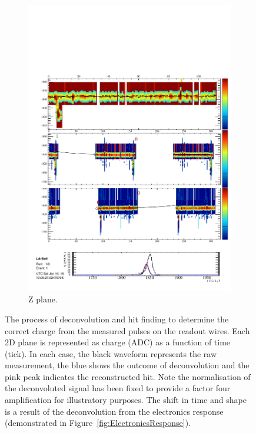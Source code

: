 \begin{figure}
\begin{subfigure}[t]{0.3\linewidth}
    \includegraphics[width=\textwidth]{HitFindingZ.pdf}
    \caption{Z plane.}
    \label{fig:HitFindingZ}
  \end{subfigure}
  \caption[The process of deconvolution and hit finding to determine the correct charge from the measured pulses on the readout wires.]{The process of deconvolution and hit finding to determine the correct charge from the measured pulses on the readout wires.  Each 2D plane is represented as charge (ADC) as a function of time (tick).  In each case, the black waveform represents the raw measurement, the blue shows the outcome of deconvolution and the pink peak indicates the reconstructed hit.  Note the normalisation of the deconvoluted signal has been fixed to provide a factor four amplification for illustratory purposes.  The shift in time and shape is a result of the deconvolution from the electronics response (demonstrated in Figure~\ref{fig:ElectronicsResponse}).}
  \label{fig:HitFinding}
\end{figure}

